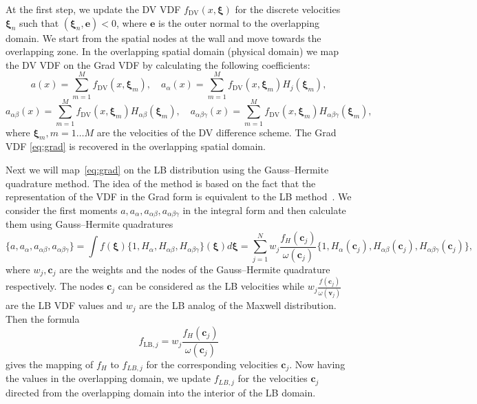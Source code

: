 \documentclass[]{elsarticle} %
\newcommand{\bxi}{\boldsymbol{\xi}}
\newcommand{\bv}{\boldsymbol{v}}
\newcommand{\bc}{\boldsymbol{c}}
\newcommand{\LB}{\mathrm{LB}}
\newcommand{\DV}{\mathrm{DV}}
\newcommand{\ai}{a_{\alpha}}
\newcommand{\aij}{a_{\alpha\beta}}
\newcommand{\aijk}{a_{\alpha\beta\gamma}}
\newcommand{\Hi}{H_{\alpha}}
\newcommand{\Hij}{H_{\alpha\beta}}
\newcommand{\Hijk}{H_{\alpha\beta\gamma}}
\begin{document}
At the first step, we update the DV VDF $f_\DV(x,\bxi)$ for the discrete velocities $\bxi_n$ such that $(\bxi_n,\mathbf{e})<0$,
where $\mathbf{e}$ is the outer normal to the overlapping domain.
We start from the  spatial nodes at the wall and move towards  the overlapping zone.
In the overlapping spatial domain (physical domain)  we map the DV VDF  on the Grad VDF by calculating the following coefficients:
\begin{equation}
    a(x)=\sum_{m=1}^M f_\DV(x,\bxi_m), \quad \ai(x)=\sum_{m=1}^Mf_\DV(x,\bxi_m)H_j(\bxi_m),
\end{equation}
\begin{equation}
    \aij(x)=\sum_{m=1}^Mf_\DV(x,\bxi_m)\Hij(\bxi_m), \quad
    \aijk(x)=\sum_{m=1}^Mf_\DV(x,\bxi_m)\Hijk(\bxi_m),
\end{equation}
where $\bxi_m, m=1 \ldots M$ are the velocities of the DV difference scheme.
The Grad VDF \eqref{eq:grad} is recovered in the overlapping spatial domain.

Next we will map~\eqref{eq:grad} on the LB distribution using the Gauss--Hermite quadrature method.
The idea of the method is based on the fact that the representation of the VDF in the Grad form
is equivalent to the LB method~\cite{He1997, Shan1998, Shan2006}.
We consider the first moments $a,\ai,\aij, \aijk$ in the integral form and then calculate them using Gauss--Hermite quadratures
\begin{equation}
    \{ a, \ai, \aij, \aijk \}=\int f(\bxi)\{ 1, \Hi, \Hij, \Hijk \}(\bxi)d\bxi =
    \sum_{j=1}^N w_j\frac{f_H(\bc_j)}{\omega(\bc_j)} \{ 1, \Hi(\bc_j), \Hij(\bc_j), \Hijk(\bc_j) \},
\end{equation}
where $w_j, \bc_j$ are the weights and the nodes of the Gauss--Hermite quadrature respectively.
The nodes $\bc_j$ can be considered as the LB velocities while $ w_j\frac{f(\bc_j)}{\omega(\bv_j)}$ are the LB VDF values and
$w_j$ are the LB analog of the Maxwell distribution.  Then the formula
\begin{equation}\label{eq:grad_to_latt}
f_{\LB,j}= w_j\frac{f_H(\bc_j)}{\omega(\bc_j)}
\end{equation}
gives the mapping of $f_H$ to $f_{LB,j}$ for the corresponding velocities $\bc_j$.
Now having the values in the overlapping domain, we update $f_{LB,j}$ for the velocities $\bc_j$
directed from the overlapping domain into the interior of the LB domain.
\end{document}
